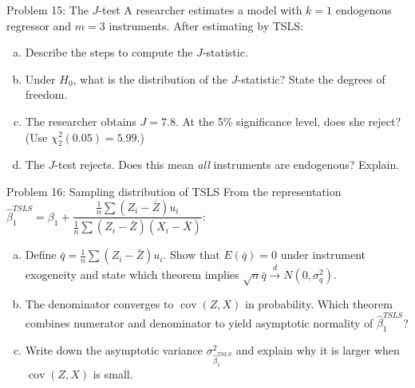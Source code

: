 \documentclass[10pt]{beamer}
\begin{document}
\begin{frame}{Problem 15: The $J$-test}
\label{q15}
A researcher estimates a model with $k=1$ endogenous regressor and $m=3$ instruments. After estimating by TSLS:

\begin{enumerate}[(a)]
  \item Describe the steps to compute the $J$-statistic.
  \item Under $H_0$, what is the distribution of the $J$-statistic? State the degrees of freedom.
  \item The researcher obtains $J = 7.8$. At the 5\% significance level, does she reject? (Use $\chi^2_2(0.05) = 5.99$.)
  \item The $J$-test rejects. Does this mean \emph{all} instruments are endogenous? Explain.
\end{enumerate}

\vfill
\hfill\hyperlink{s15}{}
\end{frame}

\begin{frame}{Problem 16: Sampling distribution of TSLS}
\label{q16}
From the representation $\widehat{\beta}_1^{TSLS} = \beta_1 + \dfrac{\frac{1}{n}\sum(Z_i - \bar{Z})u_i}{\frac{1}{n}\sum(Z_i - \bar{Z})(X_i - \bar{X})}$:

\begin{enumerate}[(a)]
  \item Define $\bar{q} = \frac{1}{n}\sum(Z_i - \bar{Z})u_i$. Show that $E(\bar{q}) = 0$ under instrument exogeneity and state which theorem implies $\sqrt{n}\bar{q} \xrightarrow{d} N(0, \sigma_q^2)$.
  \item The denominator converges to $\operatorname{cov}(Z,X)$ in probability. Which theorem combines numerator and denominator to yield asymptotic normality of $\widehat{\beta}_1^{TSLS}$?
  \item Write down the asymptotic variance $\sigma_{\widehat{\beta}_1^{TSLS}}^2$ and explain why it is larger when $\operatorname{cov}(Z,X)$ is small.
\end{enumerate}

\vfill
\hfill\hyperlink{s16}{}
\end{frame}
\end{document}
